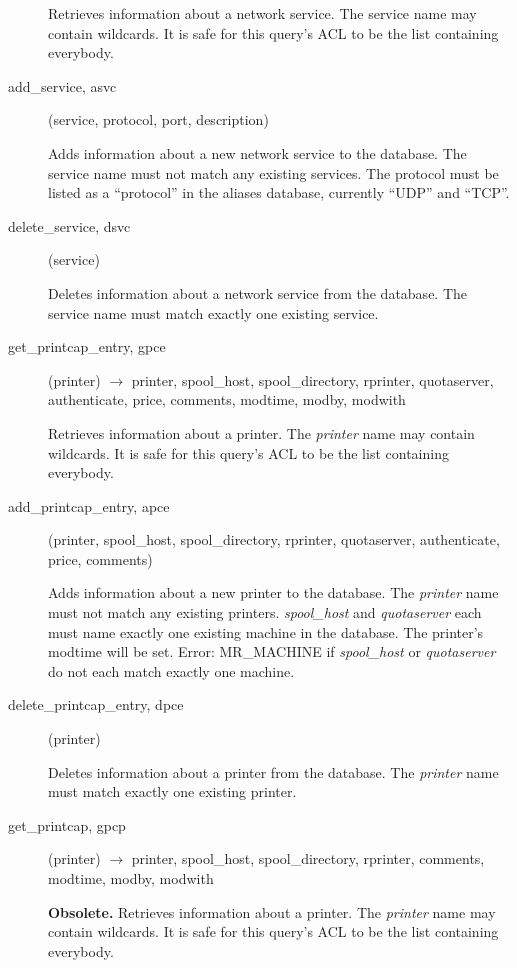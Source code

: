 \begin{description}
Retrieves information about a network service.  The service name may
contain wildcards.  It is safe for this query's ACL to be the list
containing everybody.

\item[add\_service, asvc](service, protocol, port, description)

Adds information about a new network service to the database.  The
service name must not match any existing services.  The protocol must
be listed as a ``protocol'' in the aliases database, currently ``UDP'' and
``TCP''.

\item[delete\_service, dsvc](service)

Deletes information about a network service from the database.  The
service name must match exactly one existing service.

\item[get\_printcap\_entry, gpce](printer) $\rightarrow$ printer, spool\_host,
spool\_directory, rprinter, quotaserver, authenticate, price, comments,
modtime, modby, modwith

Retrieves information about a printer.  The {\em printer} name may
contain wildcards.  It is safe for this query's ACL to be the list
containing everybody.

\item[add\_printcap\_entry, apce](printer, spool\_host, spool\_directory,
rprinter, quotaserver, authenticate, price, comments)

Adds information about a new printer to the database.  The {\em printer}
name must not match any existing printers.  {\em spool\_host} and
{\em quotaserver} each must name exactly one existing machine in the
database.  The printer's modtime will be set.  Error: MR\_MACHINE if
{\em spool\_host} or {\em quotaserver} do not each match exactly one
machine.

\item[delete\_printcap\_entry, dpce](printer)

Deletes information about a printer from the database.  The
{\em printer} name must match exactly one existing printer.

\item[get\_printcap, gpcp](printer) $\rightarrow$ printer, spool\_host,
spool\_directory, rprinter, comments, modtime, modby, modwith

{\bf Obsolete.}
Retrieves information about a printer.  The {\em printer} name may
contain wildcards.  It is safe for this query's ACL to be the list
containing everybody.


\end{description}

